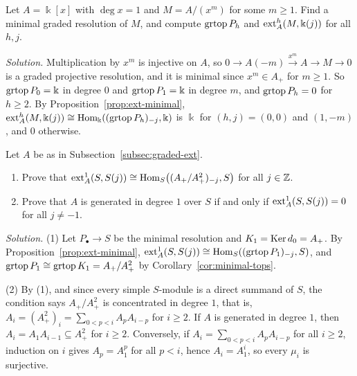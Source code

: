 \begin{exercise}
Let $A=\Bbbk[x]$ with $\deg x=1$ and $M=A/(x^m)$ for some $m\geq1$.
Find a minimal graded resolution of $M$, and compute $\operatorname{grtop}\nolimits P_h$ and $\operatorname{ext}\nolimits_A^h(M,\Bbbk(j))$ for all $h,j$.
\end{exercise}

\begin{hidden}
\emph{Solution.}
Multiplication by $x^m$ is injective on $A$, so $0\to A(-m)\xrightarrow{x^m}A\to M\to0$ is a graded projective resolution, and it is minimal since $x^m\in A_+$ for $m\geq1$.
So $\operatorname{grtop}\nolimits P_0=\Bbbk$ in degree $0$ and $\operatorname{grtop}\nolimits P_1=\Bbbk$ in degree $m$, and $\operatorname{grtop}\nolimits P_h=0$ for $h\geq2$.
By Proposition~\ref{prop:ext-minimal}, $\operatorname{ext}\nolimits_A^h(M,\Bbbk(j))\cong\operatorname{Hom}\nolimits_\Bbbk((\operatorname{grtop}\nolimits P_h)_{-j},\Bbbk)$ is $\Bbbk$ for $(h,j)=(0,0)$ and $(1,-m)$, and $0$ otherwise.
\end{hidden}


\begin{exercise}
Let $A$ be as in Subsection~\ref{subsec:graded-ext}.
\begin{enumerate}
\item Prove that $\operatorname{ext}\nolimits_A^1(S,S(j))\cong\operatorname{Hom}\nolimits_S\bigl((A_+/A_+^2)_{-j},S\bigr)$ for all $j\in\mathbb{Z}$.
\item Prove that $A$ is generated in degree $1$ over $S$ if and only if $\operatorname{ext}\nolimits_A^1(S,S(j))=0$ for all $j\neq-1$.
\end{enumerate}
\end{exercise}

\begin{hidden}
\emph{Solution.}
(1) Let $P_\bullet\to S$ be the minimal resolution and $K_1=\operatorname{Ker}\nolimits d_0=A_+$.
By Proposition~\ref{prop:ext-minimal}, $\operatorname{ext}\nolimits_A^1(S,S(j))\cong\operatorname{Hom}\nolimits_S((\operatorname{grtop}\nolimits P_1)_{-j},S)$, and $\operatorname{grtop}\nolimits P_1\cong\operatorname{grtop}\nolimits K_1=A_+/A_+^2$ by Corollary~\ref{cor:minimal-tops}.

(2) By (1), and since every simple $S$-module is a direct summand of $S$, the condition says $A_+/A_+^2$ is concentrated in degree $1$, that is, $A_i=(A_+^2)_i=\sum_{0<p<i}A_pA_{i-p}$ for $i\geq2$.
If $A$ is generated in degree $1$, then $A_i=A_1A_{i-1}\subseteq A_+^2$ for $i\geq2$.
Conversely, if $A_i=\sum_{0<p<i}A_pA_{i-p}$ for all $i\geq2$, induction on $i$ gives $A_p=A_1^p$ for all $p<i$, hence $A_i=A_1^i$, so every $\mu_i$ is surjective.
\end{hidden}

